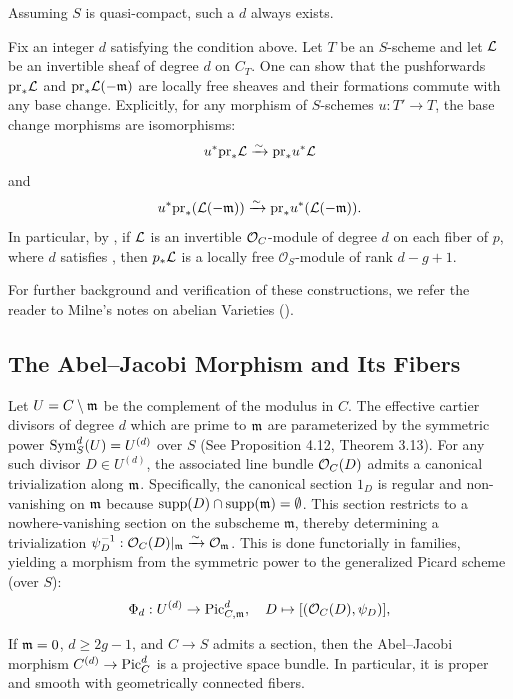 Assuming $S$ is quasi-compact, such a $d$ always exists.

Fix an integer $d$ satisfying the condition above. Let $T$ be an $S$-scheme and let $\cL$ be an invertible sheaf of degree $d$ on $C_T$. One can show that the pushforwards $\mathrm{pr}_* \cL$ and $\mathrm{pr}_* \cL(-{\mdls})$ are locally free sheaves and their formations commute with any base change. Explicitly, for any morphism of $S$-schemes $u : T' \to T$, the base change morphisms are isomorphisms:
\[
    u^* \mathrm{pr}_* \cL \xrightarrow{\sim} \mathrm{pr}_* u^* \cL
\]
and
\[
    u^* \mathrm{pr}_* (\cL(-{\mdls})) \xrightarrow{\sim} \mathrm{pr}_* u^* (\cL(-{\mdls})).
\]
In particular, by \cite[Proposition~4.3]{Guignard2018}, if $\cL$ is an
invertible $\cO_C$-module of degree $d$ on each fiber of $p$, where $d$
satisfies , then $p_*\cL$ is a locally free
$\mathcal{O}_S$-module of rank $d-g+1$.

For further background and verification of these constructions, we refer the reader to Milne's notes on abelian Varieties (\cite{milneAV}).

\subsection{The Abel--Jacobi Morphism and Its Fibers}\label{section:AbelJacobi}


Let $U = C \setminus \mdls$ be the complement of the modulus in $C$.
The effective cartier divisors of degree $d$ which are prime to $\mdls$ are parameterized by the symmetric power $\Sym_S^d (U) = U^{(d)}$ over $S$ (See \cite{Guignard2018} Proposition 4.12, \cite{milneAV} Theorem 3.13).
For any such divisor $D \in U^{(d)}$, the associated line bundle $\Oo_C(D)$ admits a canonical trivialization along $\mdls$. 
Specifically, the canonical section $1_D$ is regular and non-vanishing on $\mdls$ because $\operatorname{supp}(D) \cap \operatorname{supp}(\mdls) = \emptyset$. 
This section restricts to a nowhere-vanishing section on the subscheme $\mathfrak{m}$, thereby determining a trivialization $\psi_D^{-1}: \Oo_C(D)|_{\mdls} \xrightarrow{\sim} \Oo_{\mdls}$.
This is done functorially in families, yielding a morphism from the symmetric power to the generalized Picard scheme (over $S$):
\begin{equation}
    \Phi_{d}: U^{(d)} \to \Pic^d_{C, \mathfrak{m}}, \quad D \mapsto [(\mathcal{O}_C(D), \psi_D)],
\end{equation}

If $\mdls=0$, $d\geq 2g-1$, and $C\to S$ admits a section, then the
Abel--Jacobi morphism $C^{(d)}\to\PicC[d]$ is a projective space bundle. In
particular, it is proper and smooth with geometrically connected fibers.


